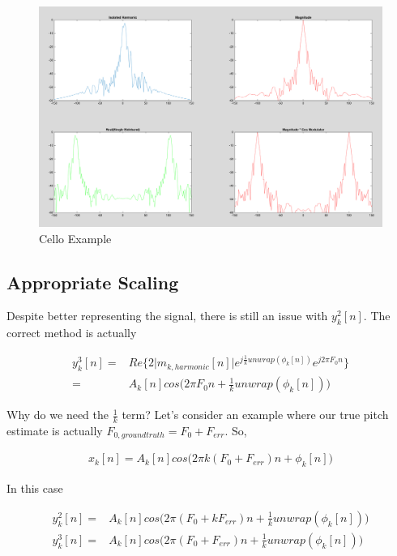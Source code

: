 \documentclass [11pt, proquest] {uwthesis}[2015/03/03]
\begin{document}
\begin{figure}[!ht]
  \centering
    \includegraphics[width=1\textwidth]{real_vs_magnitude_example}   
    \caption{Cello Example}
    \label{fig:real_vs_magnitude_example}
\end{figure}

\subsection{Appropriate Scaling}

Despite better representing the signal, there is still an issue with $y_k^2[n]$.  The correct method is actually

\begin{align}
\label{eq:realVSmag3}
y_k^3[n] =& Re\{ 2 \vert m_{k,harmonic}[n]  \vert e^{j \frac{1}{k} unwrap(\phi_k[n])} e^{j2\pi F_0 n} \}  \\
=& A_k[n]cos\Big(2\pi F_0 n + \frac{1}{k}unwrap(\phi_k[n])\Big) \nonumber
\end{align}


Why do we need the $\frac{1}{k}$ term?  Let's consider an example where our true pitch estimate is actually $F_{0,ground truth} = F_0 + F_{err}$.  So,

\begin{align}
x_k[n] = A_k[n]cos\Big(2\pi k(F_0 + F_{err})n + \phi_k[n]\Big)
\end{align}

In this case

\begin{align}
y_k^2[n] =& A_k[n]cos\Big(2\pi (F_0 + kF_{err})n + \frac{1}{k}unwrap(\phi_k[n])\Big) \\
y_k^3[n] =& A_k[n]cos\Big(2\pi (F_0 + F_{err})n + \frac{1}{k}unwrap(\phi_k[n])\Big)
\end{align}
\end{document}

